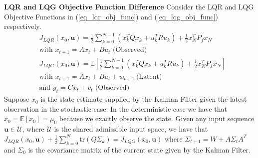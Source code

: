 \begin{thrm}
\textbf{LQR and LQG Objective Function Difference} Consider the LQR and LQG Objective Functions in (\ref{eq_lqr_obj_func}) and (\ref{eq_lqg_obj_func}) respectively. 
\begin{align}
&J_{LQR}(x_0, \mathbf{u}) = \frac{1}{2}\sum_{k=0}^{N-1} \left( x_k^TQx_k + u_k^TRu_k \right) + \frac{1}{2}x_N^TP_fx_N \label{eq_lqr_obj_func} \\
& \text{with } x_{t+1} = Ax_t +Bu_t \text{ (Observed)} \nonumber\\
& J_{LQG}(x_0, \mathbf{u}) =  \mathbb{E}\left[ \frac{1}{2}\sum_{k=0}^{N-1} \left( x_k^TQx_k + u_k^TRu_k \right) + \frac{1}{2}x_N^TP_fx_N \right] \label{eq_lqg_obj_func} \\
& \text{with } x_{t+1} = Ax_t +Bu_t + w_{t+1}~\text{(Latent)} \nonumber \\
& \text{and } y_{t} = Cx_t + v_t \text{ (Observed)} \nonumber
\end{align}
Suppose $x_0$ is the state estimate supplied by the Kalman Filter given the latest observation in the stochastic case. In the deterministic case we have that $x_0 = \mathbb{E}[x_0] = \mu_0$ because we exactly observe the state. Given any input sequence $\mathbf{u} \in \mathcal{U}$, where $\mathcal{U}$ is the shared admissible input space, we have that $J_{LQR}(x_0, \mathbf{u}) + \frac{1}{2}\sum_{k=0}^N \text{tr}(Q\Sigma_k) = J_{LQG}(x_0, \mathbf{u})$ where $ \Sigma_{t+1} = W+A\Sigma_t A^T$ and $\Sigma_0$ is the covariance matrix of the current state given by the Kalman Filter.
\label{thrm_lqr_lqg_diff}
\end{thrm}
